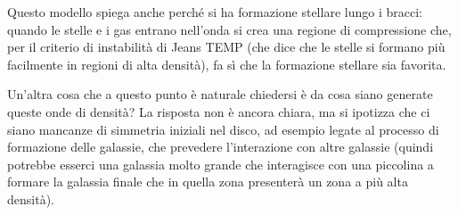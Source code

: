 Questo modello spiega anche perché si ha formazione stellare lungo i bracci: quando le stelle e i gas entrano nell’onda si crea una regione di compressione che, per il criterio di instabilità di Jeans TEMP (che dice che le stelle si formano più facilmente in regioni di alta densità), fa sì che la formazione stellare sia favorita.

Un'altra cosa che a questo punto è naturale chiedersi è da cosa siano generate queste onde di densità? La risposta non è ancora chiara, ma si ipotizza che ci siano mancanze di simmetria iniziali nel disco, ad esempio legate al processo di formazione delle galassie, che prevedere l’interazione con altre galassie (quindi potrebbe esserci una galassia molto grande che interagisce con una piccolina a formare la galassia finale che in quella zona presenterà un zona a più alta densità).
